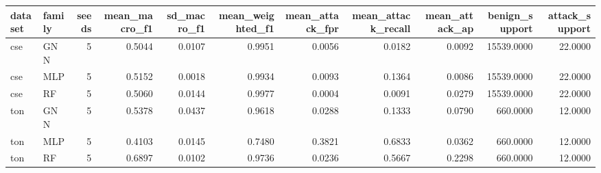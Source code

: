 \begin{tabular}{llrrrrrrrrr}
\toprule
dataset & family & seeds & mean_macro_f1 & sd_macro_f1 & mean_weighted_f1 & mean_attack_fpr & mean_attack_recall & mean_attack_ap & benign_support & attack_support \\
\midrule
cse & GNN & 5 & 0.5044 & 0.0107 & 0.9951 & 0.0056 & 0.0182 & 0.0092 & 15539.0000 & 22.0000 \\
cse & MLP & 5 & 0.5152 & 0.0018 & 0.9934 & 0.0093 & 0.1364 & 0.0086 & 15539.0000 & 22.0000 \\
cse & RF & 5 & 0.5060 & 0.0144 & 0.9977 & 0.0004 & 0.0091 & 0.0279 & 15539.0000 & 22.0000 \\
ton & GNN & 5 & 0.5378 & 0.0437 & 0.9618 & 0.0288 & 0.1333 & 0.0790 & 660.0000 & 12.0000 \\
ton & MLP & 5 & 0.4103 & 0.0145 & 0.7480 & 0.3821 & 0.6833 & 0.0362 & 660.0000 & 12.0000 \\
ton & RF & 5 & 0.6897 & 0.0102 & 0.9736 & 0.0236 & 0.5667 & 0.2298 & 660.0000 & 12.0000 \\
\bottomrule
\end{tabular}
